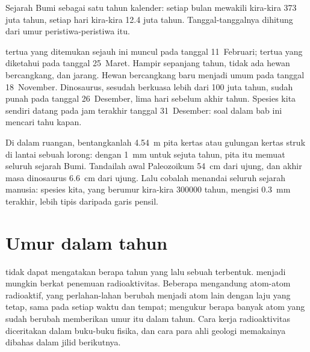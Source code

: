 \begin{omfigure}
{\small Sejarah Bumi sebagai satu tahun kalender: setiap bulan mewakili
kira-kira \num{373} juta tahun, setiap hari kira-kira \num{12.4} juta
tahun. Tanggal-tanggalnya dihitung dari umur peristiwa-peristiwa itu.}
\label{fig:g7:geological-time:calendar}
\end{omfigure}

 tertua yang ditemukan sejauh ini muncul pada tanggal 11~Februari;
 tertua yang diketahui pada tanggal 25~Maret. Hampir sepanjang tahun,
tidak ada hewan bercangkang, dan  jarang. Hewan bercangkang baru
menjadi umum pada tanggal 18~November. Dinosaurus, sesudah berkuasa lebih
dari \num{100} juta tahun, sudah punah pada tanggal 26~Desember, lima hari
sebelum akhir tahun. Spesies kita sendiri datang pada jam terakhir tanggal
31~Desember: soal dalam bab ini mencari tahu kapan.

\begin{inthelab}
Di dalam ruangan, bentangkanlah \qty{4.54}{m} pita kertas atau gulungan
kertas struk di lantai sebuah lorong: dengan \qty{1}{mm} untuk sejuta
tahun, pita itu memuat seluruh sejarah Bumi. Tandailah awal Paleozoikum
\qty{54}{cm} dari ujung, dan akhir masa dinosaurus \qty{6.6}{cm} dari
ujung. Lalu cobalah menandai seluruh sejarah manusia: spesies kita, yang
berumur kira-kira \num{300000} tahun, mengisi \qty{0.3}{mm} terakhir, lebih
tipis daripada garis pensil.
\end{inthelab}

\section{Umur dalam tahun}

 tidak dapat mengatakan berapa tahun yang lalu sebuah
 terbentuk.  menjadi mungkin berkat penemuan
radioaktivitas. Beberapa  mengandung atom-atom radioaktif, yang
perlahan-lahan berubah menjadi atom lain dengan laju yang tetap, sama pada
setiap waktu dan tempat; mengukur berapa banyak atom yang sudah berubah
memberikan umur  itu dalam tahun. Cara kerja radioaktivitas
diceritakan dalam buku-buku fisika, dan cara para ahli geologi memakainya
dibahas dalam jilid berikutnya.


